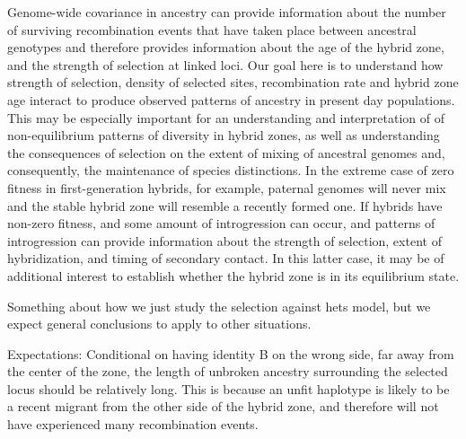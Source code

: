 \documentclass[12pt]{article}
\begin{document}
Genome-wide covariance in ancestry can provide information about the number of surviving recombination events that have taken place between ancestral genotypes and therefore provides information about the age of the hybrid zone, and the strength of selection at linked loci. Our goal here is  to understand how strength of selection, density of selected sites, recombination rate and hybrid zone age interact to produce observed patterns of ancestry in present day populations. This may be especially important for an understanding and interpretation of of non-equilibrium patterns of diversity in hybrid zones, as well as understanding the consequences of selection on the extent of mixing of ancestral genomes and, consequently, the maintenance of species distinctions. In the extreme case of zero fitness in first-generation hybrids, for example, paternal genomes will never mix and the stable hybrid zone will resemble a recently formed one. If hybrids have non-zero fitness, and some amount of introgression can occur, and patterns of introgression can provide information about the strength of selection, extent of hybridization, and timing of secondary contact. In this latter case, it may be of additional interest to establish whether the hybrid zone is in its equilibrium state. 

Something about how we just study the selection against hets model,
but we expect general conclusions to apply to other situations.

Expectations:
Conditional  on having identity B on the wrong side, far away from the center of the zone, the length of unbroken ancestry surrounding the selected locus should be relatively long. This is because an unfit haplotype is likely to be a recent migrant from the other side of the hybrid zone, and therefore will not have experienced many recombination events. 


\end{document}
